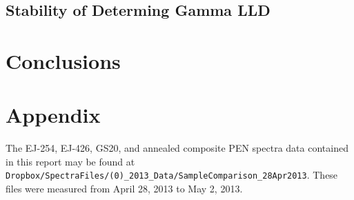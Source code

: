 \documentclass[draftcls,onecolumn]{IEEEtran}
\begin{document}
\subsection{Stability of Determing Gamma LLD}
\begin{figure}


\end{figure}

\section{Conclusions}

\section{Appendix}
The EJ-254, EJ-426, GS20, and annealed composite PEN spectra data contained in this report may be found at \verb+Dropbox/SpectraFiles/(0)_2013_Data/SampleComparison_28Apr2013+.
These files were measured from April 28, 2013 to May 2, 2013.
\end{document}

